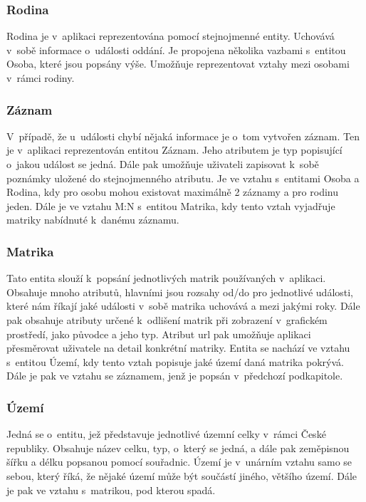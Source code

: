 \subsubsection{Rodina}

Rodina je v~aplikaci reprezentována pomocí stejnojmenné entity. Uchovává v~sobě informace o~události oddání. Je propojena několika vazbami s~entitou Osoba, které jsou popsány výše. Umožňuje reprezentovat vztahy mezi osobami v~rámci rodiny.

\subsubsection{Záznam}

V~případě, že u~události chybí nějaká informace je o~tom vytvořen záznam. Ten je v~aplikaci reprezentován entitou Záznam. Jeho atributem je typ popisující o~jakou událost se jedná. Dále pak umožňuje uživateli zapisovat k~sobě poznámky uložené do stejnojmenného atributu. Je ve vztahu s~entitami Osoba a Rodina, kdy pro osobu mohou existovat maximálně 2 záznamy a pro rodinu jeden. Dále je ve vztahu M:N s~entitou Matrika, kdy tento vztah vyjadřuje matriky nabídnuté k~danému záznamu.

\subsubsection{Matrika}

Tato entita slouží k~popsání jednotlivých matrik používaných v~aplikaci. Obsahuje mnoho atributů, hlavními jsou rozsahy od/do pro jednotlivé události, které nám říkají jaké události v~sobě matrika uchovává a mezi jakými roky. Dále pak obsahuje atributy určené k~odlišení matrik při zobrazení v~grafickém prostředí, jako původce a jeho typ. Atribut url pak umožňuje aplikaci přesměrovat uživatele na detail konkrétní matriky. Entita se nachází ve vztahu s~entitou Území, kdy tento vztah popisuje jaké území daná matrika pokrývá. Dále je pak ve vztahu se záznamem, jenž je popsán v~předchozí podkapitole.

\subsubsection{Území}

Jedná se o~entitu, jež představuje jednotlivé územní celky v~rámci České republiky. Obsahuje název celku, typ, o~který se jedná, a dále pak zeměpisnou šířku a délku popsanou pomocí souřadnic. Území je v~unárním vztahu samo se sebou, který říká, že nějaké území může být součástí jiného, většího území. Dále je pak ve vztahu s~matrikou, pod kterou spadá.

